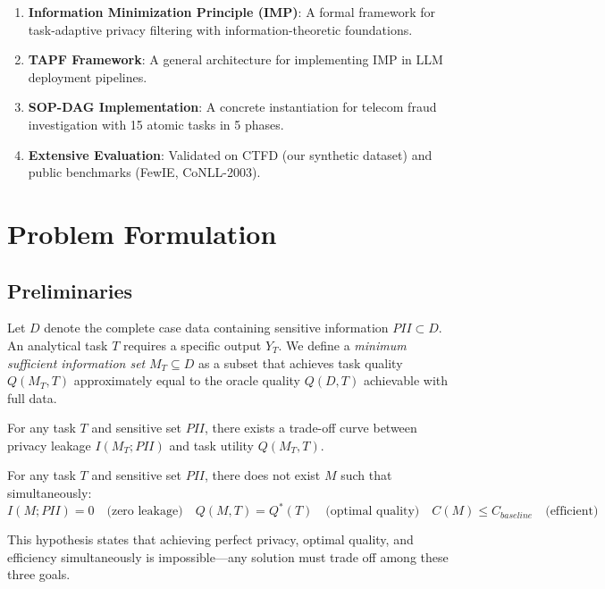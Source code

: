 \documentclass[letterpaper]{article}
\begin{document}
\begin{enumerate}
    \item \textbf{Information Minimization Principle (IMP)}: A formal framework for task-adaptive privacy filtering with information-theoretic foundations.
    \item \textbf{TAPF Framework}: A general architecture for implementing IMP in LLM deployment pipelines.
    \item \textbf{SOP-DAG Implementation}: A concrete instantiation for telecom fraud investigation with 15 atomic tasks in 5 phases.
    \item \textbf{Extensive Evaluation}: Validated on CTFD (our synthetic dataset) and public benchmarks (FewIE, CoNLL-2003).
\end{enumerate}

\section{Problem Formulation}

\subsection{Preliminaries}

Let $D$ denote the complete case data containing sensitive information $PII \subset D$.
%
An analytical task $T$ requires a specific output $Y_T$.
%
We define a \emph{minimum sufficient information set} $M_T \subseteq D$ as a subset that achieves task quality $Q(M_T, T)$ approximately equal to the oracle quality $Q(D, T)$ achievable with full data.

\begin{definition}
For any task $T$ and sensitive set $PII$, there exists a trade-off curve between privacy leakage $I(M_T; PII)$ and task utility $Q(M_T, T)$.
\end{definition}

\begin{hypothesis}
For any task $T$ and sensitive set $PII$, there does not exist $M$ such that simultaneously:
\begin{equation}
    I(M; PII) = 0 \quad \text{(zero leakage)} \quad
    Q(M, T) = Q^*(T) \quad \text{(optimal quality)} \quad
    C(M) \leq C_{baseline} \quad \text{(efficient)}
\end{equation}
\end{hypothesis}

This hypothesis states that achieving perfect privacy, optimal quality, and efficiency simultaneously is impossible---any solution must trade off among these three goals.
\end{document}
